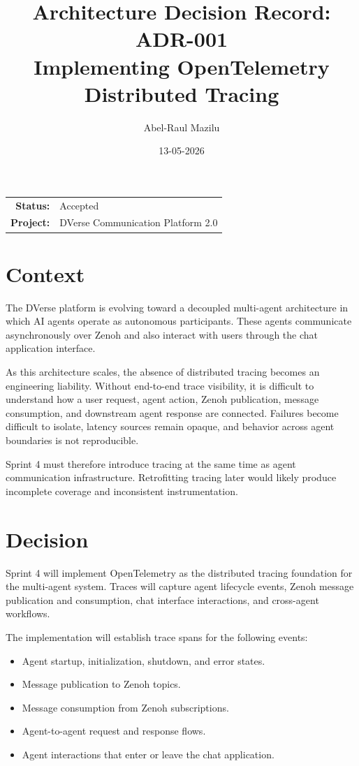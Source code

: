 \documentclass[11pt]{article}
\title{Architecture Decision Record: ADR-001\\
\large Implementing OpenTelemetry Distributed Tracing}
\author{Abel-Raul Mazilu}
\date{13-05-2026}
\begin{document}
\maketitle

\begin{center}
\begin{tabular}{rl}
\textbf{Status:} & Accepted \\
\textbf{Project:} & DVerse Communication Platform 2.0 \\
\end{tabular}
\end{center}

\section{Context}

The DVerse platform is evolving toward a decoupled multi-agent architecture in which AI agents operate as autonomous participants. These agents communicate asynchronously over Zenoh and also interact with users through the chat application interface.

As this architecture scales, the absence of distributed tracing becomes an engineering liability. Without end-to-end trace visibility, it is difficult to understand how a user request, agent action, Zenoh publication, message consumption, and downstream agent response are connected. Failures become difficult to isolate, latency sources remain opaque, and behavior across agent boundaries is not reproducible.

Sprint 4 must therefore introduce tracing at the same time as agent communication infrastructure. Retrofitting tracing later would likely produce incomplete coverage and inconsistent instrumentation.

\section{Decision}

Sprint 4 will implement OpenTelemetry as the distributed tracing foundation for the multi-agent system. Traces will capture agent lifecycle events, Zenoh message publication and consumption, chat interface interactions, and cross-agent workflows.

The implementation will establish trace spans for the following events:

\begin{itemize}
    \item Agent startup, initialization, shutdown, and error states.
    \item Message publication to Zenoh topics.
    \item Message consumption from Zenoh subscriptions.
    \item Agent-to-agent request and response flows.
    \item Agent interactions that enter or leave the chat application.
\end{itemize}
\end{document}
